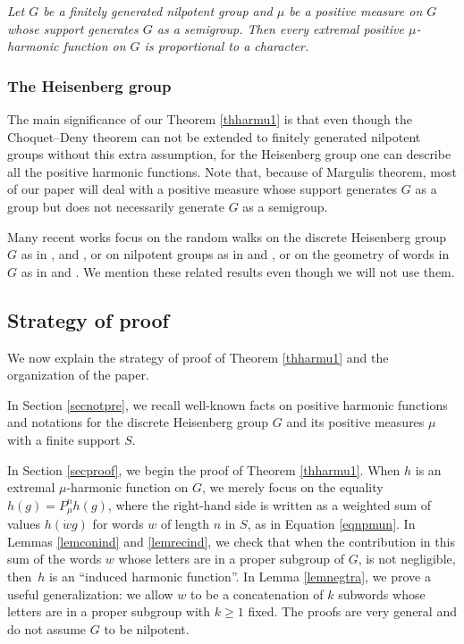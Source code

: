 \documentclass[JEP,XML,SOM,Unicode]{cedram}
\theoremstyle{definition}
\let\bq\relax
\let\eq\relax
\begin{document}
\emph{Let $G$ be a finitely generated nilpotent group
and $\mu$ be a positive measure on $G$
whose support generates $G$ \emph{as a semigroup}.
Then every extremal positive $\mu$-harmonic
function on $G$ is proportional to a character.}

\subsubsection{The Heisenberg group}
The main significance of our Theorem \ref{thharmu1} is
that even though the Choquet--Deny theorem can not be
extended to finitely generated nilpotent groups
without this extra assumption, for the Heisenberg group
one can describe all the positive harmonic functions.
Note that, because of Margulis theorem,
most of our paper will deal
with a positive measure whose support
generates $G$ as a group but does not
necessarily generate $G$ as a semigroup.

Many recent works focus
on the random walks on the discrete Heisenberg group
$G$ as in
\cite{Breuillard05},
\cite{DiaconisHough15} and
\cite{GollSchmidtVerbitskiy16},
or on nilpotent groups as in \cite{Breuillard10}
and \cite{Guivarch71},
or on the geometry of words in $G$ as in
\cite{LindSchmidt15} and \cite{VershikMalyutin18}.
We mention these related results
even though we will not use them.

\subsection{Strategy of proof}
\label{secstrpro}
\bq
We now explain the strategy of proof of Theorem \ref{thharmu1}
and the organization of the paper.
\eq

In Section \ref{secnotpre}, we recall well-known facts on positive harmonic functions
and notations for the discrete Heisenberg group $G$
and its positive measures $\mu$ with a finite support $S$.

In Section \ref{secproof}, we begin the proof of Theorem \ref{thharmu1}.
When $h$ is an extremal $\mu$-harmonic function on $G$, we merely focus on the
equality
$h(g)=P^n_\mu h(g)$, where the right-hand side is written as a weighted sum
of values $h(\dot{w}g)$ for words $w$ of length $n$ in $S$,
as in Equation \eqref{eqnpmun}.
In Lemmas \ref{lemconind} and \ref{lemrecind},
we check that when the contribution in this sum
of the words $w$ whose letters are in a proper subgroup of $G$,
is not negligible,
then~$h$ is an ``induced harmonic function''.
In Lemma \ref{lemnegtra}, we prove a useful generalization:
we allow $w$ to be a concatenation of $k$ subwords
whose letters are in a proper subgroup with $k \geq 1$ fixed.
The proofs are very general
and do not assume $G$ to be nilpotent.
\end{document}

